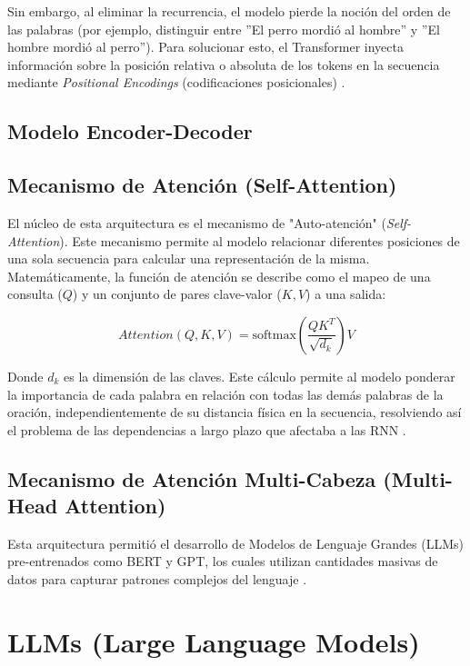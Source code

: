 \documentclass[11pt, a4paper]{article}
\begin{document}
Sin embargo, al eliminar la recurrencia, el modelo pierde la noción del orden de las palabras (por ejemplo, distinguir entre ''El perro mordió al hombre'' y ''El hombre mordió al perro''). Para
solucionar esto, el Transformer inyecta información sobre la posición relativa o absoluta de los tokens en la secuencia mediante \textit{Positional Encodings} (codificaciones posicionales) 
\parencite{vaswani2017}.

\subsection{Modelo Encoder-Decoder}

\subsection{Mecanismo de Atención (Self-Attention)}
El núcleo de esta arquitectura es el mecanismo de "Auto-atención" (\textit{Self-Attention}). Este mecanismo permite al modelo relacionar diferentes posiciones de una sola secuencia para
calcular una representación de la misma. Matemáticamente, la función de atención se describe como el mapeo de una consulta ($Q$) y un conjunto de pares clave-valor ($K, V$) a una salida:

\begin{equation}
    Attention(Q, K, V) = \text{softmax}\left(\frac{QK^T}{\sqrt{d_k}}\right)V
\end{equation}


Donde $d_k$ es la dimensión de las claves. Este cálculo permite al modelo ponderar la importancia de cada palabra en relación con todas las demás palabras de la oración, independientemente de
su distancia física en la secuencia, resolviendo así el problema de las dependencias a largo plazo que afectaba a las RNN \parencite{vaswani2017}.

\subsection{Mecanismo de Atención Multi-Cabeza (Multi-Head Attention)}

Esta arquitectura permitió el desarrollo de Modelos de Lenguaje Grandes (LLMs) pre-entrenados como BERT y GPT, los cuales utilizan cantidades masivas de datos para capturar patrones complejos
del lenguaje \parencite{atkinson2025}.

\section{LLMs (Large Language Models)}
\end{document}
